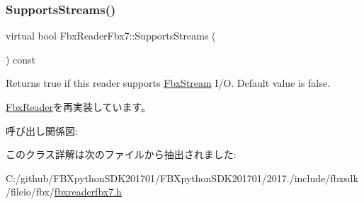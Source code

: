 \subsubsection{\texorpdfstring{Supports\+Streams()}{SupportsStreams()}}
{\footnotesize\ttfamily virtual bool Fbx\+Reader\+Fbx7\+::\+Supports\+Streams (\begin{DoxyParamCaption}{ }\end{DoxyParamCaption}) const\hspace{0.3cm}{\ttfamily [virtual]}}

Returns true if this reader supports \hyperlink{class_fbx_stream}{Fbx\+Stream} I/O. Default value is false. 

\hyperlink{class_fbx_reader_ab08a9e71a059ef6052e7fe2d8ba6c35d}{Fbx\+Reader}を再実装しています。

呼び出し関係図\+:


このクラス詳解は次のファイルから抽出されました\+:\begin{DoxyCompactItemize}
\item 
C\+:/github/\+F\+B\+Xpython\+S\+D\+K201701/\+F\+B\+Xpython\+S\+D\+K201701/2017./include/fbxsdk/fileio/fbx/\hyperlink{fbxreaderfbx7_8h}{fbxreaderfbx7.\+h}\end{DoxyCompactItemize}
